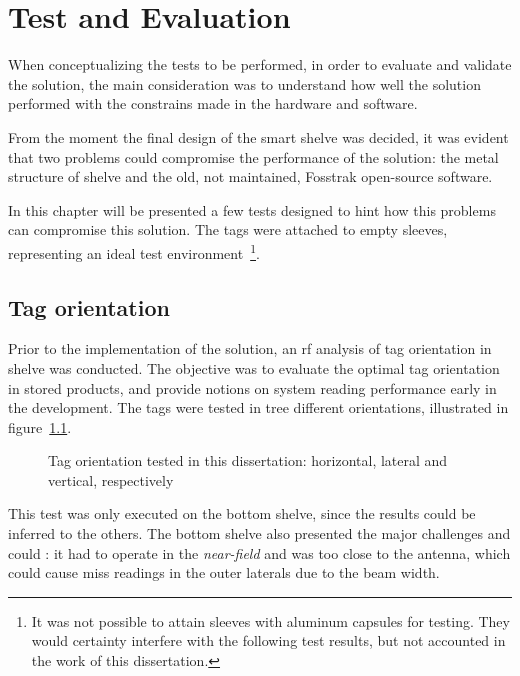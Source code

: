 \chapter{Test and Evaluation} \label{sec:tests}

When conceptualizing the tests to be performed, in order to evaluate and validate the solution, the main consideration was to understand how well the solution performed with the constrains made in the hardware and software.

From the moment the final design of the smart shelve was decided, it was evident that two problems could compromise the performance of the solution: the metal structure of shelve and the old, not maintained, Fosstrak open-source software.

In this chapter will be presented a few tests designed to hint how this problems can compromise this solution. The tags were attached to empty sleeves, representing an ideal test environment~\footnote{It was not possible to attain sleeves with aluminum capsules for testing. They would certainty interfere with the following test results, but not accounted in the work of this dissertation.}.


\section{Tag orientation} \label{sec:test1}

Prior to the implementation of the solution, an \ac{rf} analysis of tag orientation in shelve was conducted.
The objective was to evaluate the optimal tag orientation in stored products, and provide notions on system reading performance early in the development.
The tags were tested in tree different orientations, illustrated in figure~\ref{fig:tagorientations}.

\begin{figure}
    \centering
    \caption{Tag orientation tested in this dissertation: horizontal, lateral and vertical, respectively}
    \label{fig:tagorientations}
\end{figure}


This test was only executed on the bottom shelve, since the results could be inferred to the others. The bottom shelve also presented the major challenges and could : it had to operate in the \emph{near-field} and was too close to the antenna, which could cause miss readings in the outer laterals due to the beam width.

